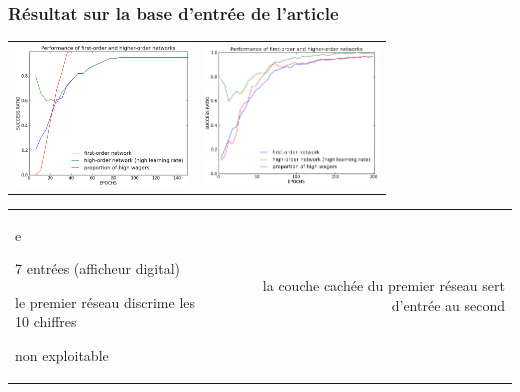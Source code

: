 \documentclass[11pt]{beamer}
\newenvironment{noitemize}
{\begin{list}{}{%
\setlength{\labelwidth}{0em}%
\setlength{\labelsep}{2pt}%
\setlength{\leftmargin}{0pt}%
\renewcommand{\makelabel}{\small\color{cloneBlue}{\textbullet}}}}%
{\end{list}}
\newenvironment{minusitemize}
{\begin{list}{}{%
\setlength{\labelwidth}{0em}%
\setlength{\labelsep}{2pt}%
\setlength{\leftmargin}{-20pt}%
\renewcommand{\makelabel}{\small\color{cloneBlue}{\textbullet}}}}%
{\end{list}}
\begin{document}
\begin{frame}\transwipe
  \frametitle{Résultat sur la base d'entrée de l'article}
  \begin{center}
  \begin{tabular}{cc}
  \hspace*{-1cm}
   \includegraphics[width=175px]{../cleeremans_2007/digital_reco/perf_wag.png}
   &
   \hspace*{-0.3cm}
   \includegraphics[width=175px]{../cleeremans_2007/digital_reco/perf_boost.png}
  \end{tabular}

  \begin{tabular}{lr}
  \begin{minipage}{170px}
    e
    \footnotesize
      \begin{minusitemize}
      \item 7 entrées (afficheur digital)
      \item le premier réseau discrime les 10 chiffres
      \item non exploitable
      \end{minusitemize}
    \end{minipage}
    &
    \begin{minipage}{170px}
    \footnotesize\begin{noitemize}
     \item la couche cachée du premier réseau sert d'entrée au second
    \end{noitemize}
    
    \end{minipage}
  \end{tabular}

  \end{center}
  
\end{frame}
\end{document}

